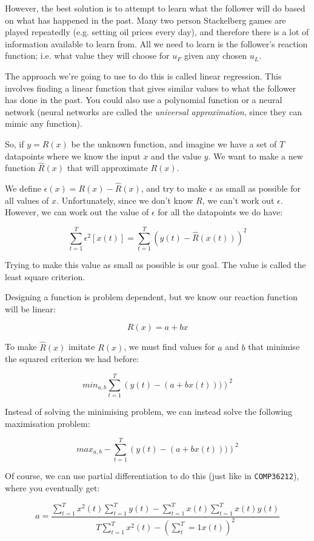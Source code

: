 However, the best solution is to attempt to learn what the follower will do
based on what has happened in the past. Many two person Stackelberg games are
played repeatedly (e.g. setting oil prices every day), and therefore there is a
lot of information available to learn from. All we need to learn is the
follower's reaction function; i.e. what value they will choose for $u_F$ given
any chosen $u_L$.

The approach we're going to use to do this is called linear regression. This
involves finding a linear function that gives similar values to what the
follower has done in the past. You could also use a polynomial function or a
neural network (neural networks are called the \textit{universal approximation},
since they can mimic any function).

So, if $y = R(x)$ be the unknown function, and imagine we have a set of $T$
datapoints where we know the input $x$ and the value $y$. We want to make a new
function $\hat{R}(x)$ that will approximate $R(x)$.

We define $\epsilon(x) = R(x) - \hat{R}(x)$, and try to make $\epsilon$ as small
as possible for all values of $x$. Unfortunately, since we don't know $R$, we
can't work out $\epsilon$. However, we can work out the value of $\epsilon$ for
all the datapoints we do have:

\[
  \sum^T_{t=1}\epsilon^2[x(t)] = \sum^T_{t=1}\left(y(t) - \hat{R}(x(t))\right)^2
\]

Trying to make this value as small as possible is our goal. The value is called
the least square criterion.

Designing a function is problem dependent, but we know our reaction function
will be linear:

\[
  R(x) = a + bx
\]

To make $\hat{R}(x)$ imitate $R(x)$, we must find values for $a$ and $b$ that
minimise the squared criterion we had before:

\[
  min_{a,b} \sum^T_{t=1}\left(y(t) - (a + b x(t)))\right)^2
\]

Instead of solving the minimising problem, we can instead solve the following
maximisation problem:

\[
  max_{a,b} - \sum^T_{t=1}\left(y(t) - (a + b x(t)))\right)^2
\]

Of course, we can use partial differentiation to do this (just like in
\texttt{COMP36212}), where you eventually get:

\[
  a = \frac{
    \sum^T_{t=1}x^2(t)\sum^T_{t=1}y(t) - \sum^T_{t=1}x(t)\sum^T_{t=1}x(t)y(t)
  }{
    T\sum^T_{t=1}x^2(t) - (\sum^T_t{=1}x(t))^2
  }
\]


